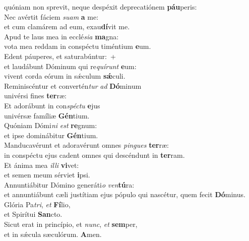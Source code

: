 \oddverse quóniam non sprevit, neque despéxit deprecatiónem \textbf{páu}peris:\\
\evenverse Nec avértit fáciem \textit{su}\textit{am} \textbf{a} me:~\*\\
\evenverse et cum clamárem ad eum, exau\textbf{dí}vit me.\\
\oddverse Apud te laus mea in ecclé\textit{si}\textit{a} \textbf{ma}gna:~\*\\
\oddverse vota mea reddam in conspéctu timéntium \textbf{e}um.\\
\evenverse Edent páuperes, et saturabúntur:~+\\
\evenverse  et laudábunt Dóminum qui re\textit{quí}\textit{runt} \textbf{e}um:~\*\\
\evenverse vivent corda eórum in sǽculum \textbf{sǽ}culi.\\
\oddverse Reminiscéntur et convertén\textit{tur} \textit{ad} \textbf{Dó}minum~\*\\
\oddverse univérsi fines \textbf{ter}ræ:\\
\evenverse Et adorábunt in con\textit{spé}\textit{ctu} \textbf{e}jus~\*\\
\evenverse univérsæ famíliæ \textbf{Gén}tium.\\
\oddverse Quóniam Dómi\textit{ni} \textit{est} \textbf{re}gnum:~\*\\
\oddverse et ipse dominábitur \textbf{Gén}tium.\\
\evenverse Manducavérunt et adoravérunt omnes \textit{pin}\textit{gues} \textbf{ter}ræ:~\*\\
\evenverse in conspéctu ejus cadent omnes qui descéndunt in \textbf{ter}ram.\\
\oddverse Et ánima mea \textit{il}\textit{li} \textbf{vi}vet:~\*\\
\oddverse et semen meum sérviet \textbf{i}psi.\\
\evenverse Annuntiábitur Dómino generáti\textit{o} \textit{ven}\textbf{tú}ra:~\*\\
\evenverse et annuntiábunt cæli justítiam ejus pópulo qui nascétur, quem fecit \textbf{Dó}minus.\\
\oddverse Glória Pa\textit{tri}, \textit{et} \textbf{Fí}lio,~\*\\
\oddverse et Spirítui \textbf{San}cto.\\
\evenverse Sicut erat in princípio, et \textit{nunc}, \textit{et} \textbf{sem}per,~\*\\
\evenverse et in sǽcula sæculórum. \textbf{A}men.\\
